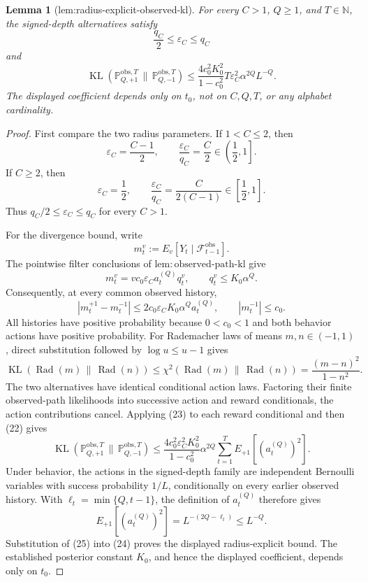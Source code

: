 \documentclass{article}
\newtheorem{lemma}{Lemma}
\begin{document}
\begin{lemma}[lem:radius-explicit-observed-kl]\label{lem:radius-explicit-observed-kl}
For every \(C>1\), \(Q\ge1\), and \(T\in\mathbb N\), the signed-depth alternatives satisfy
\[
 \frac{q_C}{2}\le\varepsilon_C\le q_C
\]
and
\[
 \operatorname{KL}(\mathbb P_{Q,+1}^{\mathrm{obs},T}\,\|\,
                    \mathbb P_{Q,-1}^{\mathrm{obs},T})
 \le
 \frac{4c_0^2K_0^2}{1-c_0^2}
 T\varepsilon_C^2\alpha^{2Q}L^{-Q}.
\]
The displayed coefficient depends only on \(t_0\), not on \(C,Q,T\), or any alphabet cardinality.
\end{lemma}
\begin{proof}
First compare the two radius parameters.  If \(1<C\le2\), then
\[
 \varepsilon_C=\frac{C-1}{2},
 \qquad
 \frac{\varepsilon_C}{q_C}=\frac C2\in\left(\frac12,1\right].
\]
If \(C\ge2\), then
\[
 \varepsilon_C=\frac12,
 \qquad
 \frac{\varepsilon_C}{q_C}=\frac{C}{2(C-1)}\in\left[\frac12,1\right].
\]
Thus \(q_C/2\le\varepsilon_C\le q_C\) for every \(C>1\).

For the divergence bound, write
\[
 m_t^v:=E_v[Y_t\mid\mathcal F_{t-1}^{\mathrm{obs}}].
\]
The pointwise filter conclusions of \(\mathrm{lem{:}observed\text{-}path\text{-}kl}\) give
\[
 m_t^v=vc_0\varepsilon_Ca_t^{(Q)}q_t^v,
 \qquad q_t^v\le K_0\alpha^Q.
\]
Consequently, at every common observed history,
\[
 |m_t^{+1}-m_t^{-1}|
 \le2c_0\varepsilon_CK_0\alpha^Qa_t^{(Q)},
 \qquad |m_t^{-1}|\le c_0. \tag{22}
\]
All histories have positive probability because \(0<c_0<1\) and both behavior actions have positive probability.  For Rademacher laws of means \(m,n\in(-1,1)\), direct substitution followed by \(\log u\le u-1\) gives
\[
 \operatorname{KL}(\operatorname{Rad}(m)\,\|\,\operatorname{Rad}(n))
 \le\chi^2(\operatorname{Rad}(m)\,\|\,\operatorname{Rad}(n))
 =\frac{(m-n)^2}{1-n^2}. \tag{23}
\]
The two alternatives have identical conditional action laws.  Factoring their finite observed-path likelihoods into successive action and reward conditionals, the action contributions cancel.  Applying (23) to each reward conditional and then (22) gives
\[
 \operatorname{KL}(\mathbb P_{Q,+1}^{\mathrm{obs},T}\,\|\,
                    \mathbb P_{Q,-1}^{\mathrm{obs},T})
 \le\frac{4c_0^2\varepsilon_C^2K_0^2}{1-c_0^2}
 \alpha^{2Q}\sum_{t=1}^TE_{+1}[(a_t^{(Q)})^2]. \tag{24}
\]
Under behavior, the actions in the signed-depth family are independent Bernoulli variables with success probability \(1/L\), conditionally on every earlier observed history.  With \(\ell_t=\min\{Q,t-1\}\), the definition of \(a_t^{(Q)}\) therefore gives
\[
 E_{+1}[(a_t^{(Q)})^2]
 =L^{-(2Q-\ell_t)}\le L^{-Q}. \tag{25}
\]
Substitution of (25) into (24) proves the displayed radius-explicit bound.  The established posterior constant \(K_0\), and hence the displayed coefficient, depends only on \(t_0\).
\end{proof}
\end{document}
